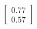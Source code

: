 \documentclass[preview]{standalone}
\begin{document}
\begin{align*}
\begin{bmatrix} 0.77 \\ 0.57 \end{bmatrix}
\end{align*}
\end{document}
